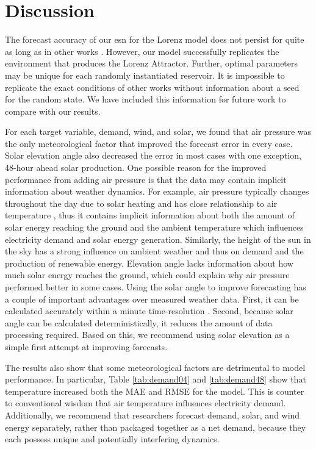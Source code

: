 \section{Discussion}

The forecast accuracy of our \gls{esn} for the Lorenz model does not persist
for quite as long as in other works \cite{pathak_using_2017}. However, our
model successfully replicates the environment that produces the Lorenz
Attractor. Further, optimal parameters may be unique for each randomly
instantiated reservoir. It is impossible to replicate the exact conditions of
other works without information about a seed for the random state. We have
included this information for future work to compare with our results.

For each target variable, demand, wind, and solar, we found that air pressure was
the only meteorological factor that improved the forecast error in every case.
Solar elevation angle also decreased the error in most cases with one exception,
48-hour ahead solar production. One possible reason for the improved performance
from adding air pressure is that the data may contain implicit information about
weather dynamics. For example, air pressure typically changes throughout the
day due to solar heating and has close relationship to air temperature
\cite{aguilar_seasonal_2001}, thus
it contains implicit information about both the amount of solar energy reaching
the ground and the ambient temperature which influences electricity demand
and solar energy generation.
Similarly, the height of the sun in the sky has a strong influence on
ambient weather and thus on  demand and the production of renewable energy.
Elevation angle lacks information about how much solar energy reaches the
ground, which could explain why air pressure performed better in some cases.
Using the solar angle to improve forecasting has a couple of important
advantages over measured weather data. First, it can be calculated accurately
within a minute time-resolution \cite{us_department_of_commerce_esrl_nodate}.
Second, because solar angle can be calculated deterministically, it reduces the
amount of data processing required. Based on this, we recommend using solar
elevation as a simple first attempt at improving forecasts.

The results also show that some meteorological factors are detrimental to
model performance. In particular, Table \ref{tab:demand04} and
\ref{tab:demand48} show that temperature increased both the MAE and RMSE for
the model. This is counter to conventional wisdom that air temperature
influences electricity demand. Additionally, we recommend that researchers
forecast demand, solar, and wind energy separately, rather than packaged
together as a net demand, because they each possess unique and potentially
interfering dynamics.

